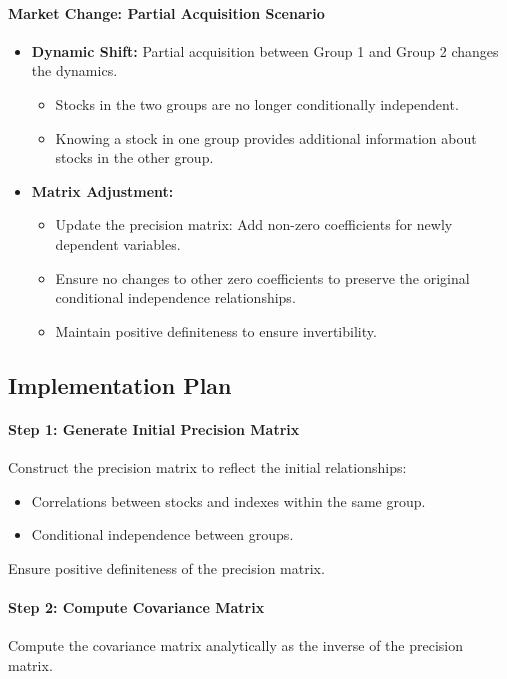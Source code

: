 \documentclass{article}
\begin{document}
\paragraph{Market Change: Partial Acquisition Scenario}
\begin{itemize}
    \item \textbf{Dynamic Shift:} Partial acquisition between Group 1 and Group 2 changes the dynamics.
    \begin{itemize}
        \item Stocks in the two groups are no longer conditionally independent.
        \item Knowing a stock in one group provides additional information about stocks in the other group.
    \end{itemize}
    \item \textbf{Matrix Adjustment:}
    \begin{itemize}
        \item Update the precision matrix: Add non-zero coefficients for newly dependent variables.
        \item Ensure no changes to other zero coefficients to preserve the original conditional independence relationships.
        \item Maintain positive definiteness to ensure invertibility.
    \end{itemize}
\end{itemize}

\subsection{Implementation Plan}
\label{subsec:implementation_plan}

\paragraph{Step 1: Generate Initial Precision Matrix}
Construct the precision matrix to reflect the initial relationships:
\begin{itemize}
    \item Correlations between stocks and indexes within the same group.
    \item Conditional independence between groups.
\end{itemize}
Ensure positive definiteness of the precision matrix.

\paragraph{Step 2: Compute Covariance Matrix}
Compute the covariance matrix analytically as the inverse of the precision matrix.
\end{document}
